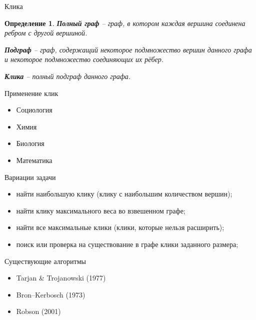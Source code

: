 \documentclass{beamer}
\theoremstyle{plain}
\newtheorem{defi}{Определение}
\begin{document}
\begin{frame}{Клика}
  \begin{defi}
    \textbf{Полный граф} -- граф, в котором каждая вершина соединена ребром с другой
    вершиной.

    \textbf{Подграф} -- граф, содержащий некоторое подмножество вершин данного графа и 
    некоторое подмножество соединяющих их рёбер.

    \textbf{Клика} -- полный подграф данного графа.
  \end{defi}
\end{frame}

\begin{frame}{Применение клик}
  \begin{itemize}
    \item Социология
    \item Химия
    \item Биология
    \item Математика
  \end{itemize}
\end{frame}

\begin{frame}{Вариации задачи}
  \begin{itemize}
    \item
    найти наибольшую клику (клику с наибольшим количеством вершин);

    \item
    найти клику максимального веса во взвешенном графе;

    \item
    найти все максимальные клики (клики, которые нельзя расширить);

    \item
    поиск или проверка на существование в графе клики заданного размера;
  \end{itemize}
\end{frame}

\begin{frame}{Существующие алгоритмы}
  \begin{itemize}
    \item Tarjan \& Trojanowski (1977)
    \item Bron–Kerbosch (1973)
    \item Robson (2001)
  \end{itemize}
\end{frame}
\end{document}

